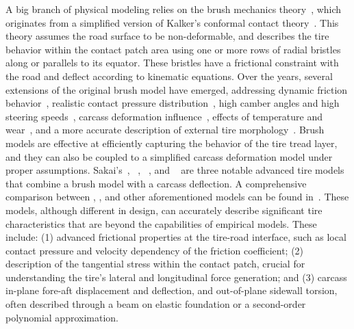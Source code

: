 A big branch of physical modeling relies on the brush mechanics theory~\cite{pacejka2012tire}, which originates from a simplified version of Kalker's conformal contact theory~\cite{kalker1967rolling, kalker1971transient, kalker1979survey, kalker1986railway, kalker1997simulation, meymand2016survey}. This theory assumes the road surface to be non-deformable, and describes the tire behavior within the contact patch area using one or more rows of radial bristles along or parallels to its equator. These bristles have a frictional constraint with the road and deflect according to kinematic equations. Over the years, several extensions of the original brush model have emerged, addressing dynamic friction behavior~\cite{deur2004brush, deur2005extensions, velenis2005dynamic, kikuuwe2019brushtype}, realistic contact pressure distribution~\cite{miyashita2010tire, fevrier2013method, xu2014analytical}, high camber angles and high steering speeds~\cite{higuchi1999transient, romano2022analytical}, carcass deformation influence~\cite{svendenius2006semiempirical, xu2014analytical, miyashita2010tire, miyashita2003analytical, miyashita2006new, kabe2006new, miyashita2015study, romano2019novel, romano2020unsteadystate, gil2020inplane}, effects of temperature and wear~\cite{fevrier2013method, harsh2019tire}, and a more accurate description of external tire morphology~\cite{chollet2012model, riehm2019brush}. Brush models are effective at efficiently capturing the behavior of the tire tread layer, and they can also be coupled to a simplified carcass deformation model under proper assumptions. Sakai's~\cite{sakai1981theoreticalI, sakai1981theoreticalII, sakai1981theoreticalIII, sakai1982theoreticalIV}, \NeoFiala{}~\cite{miyashita2003analytical, miyashita2006new, kabe2006new, miyashita2015study, miyashita2010tire}, \TreadSim{}~\cite{dehoogh2005implementing}, and \TaMeTire{}~\cite{fevrier2013method} are three notable advanced tire models that combine a brush model with a carcass deflection. A comprehensive comparison between \TreadSim{}, \TaMeTire{}, and other aforementioned models can be found in~\cite{sarkisov2019physical}. These models, although different in design, can accurately describe significant tire characteristics that are beyond the capabilities of empirical models. These include:
(1) advanced frictional properties at the tire-road interface, such as local contact pressure and velocity dependency of the friction coefficient; (2) description of the tangential stress within the contact patch, crucial for understanding the tire's lateral and longitudinal force generation; and (3) carcass in-plane fore-aft displacement and deflection, and out-of-plane sidewall torsion, often described through a beam on elastic foundation or a second-order polynomial approximation.
